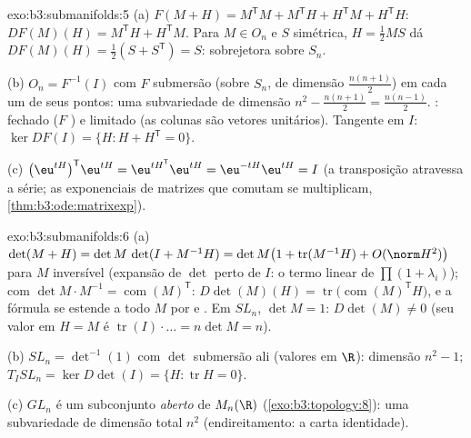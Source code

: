 \begin{solution}{exo:b3:submanifolds:5}
(a) $F(M + H) = M^{\mathsf T}M + M^{\mathsf T}H + H^{\mathsf
T}M + H^{\mathsf T}H$: $DF(M)(H) = M^{\mathsf T}H +
H^{\mathsf T}M$. Para $M \in O_n$ e $S$ simétrica, $H =
\frac12MS$ dá $DF(M)(H) = \frac12(S + S^{\mathsf T}) = S$:
sobrejetora sobre $S_n$.

(b) $O_n = F^{-1}(I)$ com $F$ submersão (sobre $S_n$, de
dimensão $\frac{n(n+1)}2$) em cada um de seus pontos:
uma subvariedade de dimensão $n^2 - \frac{n(n+1)}2 =
\frac{n(n-1)}2$. : fechado ($F$ ) e limitado
(as colunas são vetores unitários). Tangente em $I$: $\ker DF(I) =
\{H : H + H^{\mathsf T} = 0\}$.

(c) $\bigl(\eu^{tH}\bigr)^{\mathsf T}\eu^{tH} =
\eu^{tH^{\mathsf T}}\eu^{tH} = \eu^{-tH}\eu^{tH} = I$
(a transposição atravessa a série; as exponenciais de matrizes
que comutam se multiplicam,
\cref{thm:b3:ode:matrixexp}).
\end{solution}

\begin{solution}{exo:b3:submanifolds:6}
(a) $\det(M + H) = \det M\,\det(I + M^{-1}H) = \det M\bigl(1
+ \operatorname{tr}(M^{-1}H) + O(\norm H^2)\bigr)$ para
$M$ inversível (expansão de $\det$ perto de $I$: o termo linear
de $\prod(1 + \lambda_i)$); com $\det M\cdot M^{-1} =
\operatorname{com}(M)^{\mathsf T}$:
$D\det(M)(H) = \operatorname{tr}\bigl(\operatorname{com}
(M)^{\mathsf T}H\bigr)$, e a fórmula se estende a todo $M$
por  e . Em $SL_n$, $\det M = 1$:
$D\det(M) \ne 0$ (seu valor em $H = M$ é
$\operatorname{tr}(I)\cdot\dots = n\det M = n$).

(b) $SL_n = \det^{-1}(1)$ com $\det$ submersão ali
(valores em $\R$): dimensão $n^2 - 1$; $T_ISL_n = \ker
D\det(I) = \{H : \operatorname{tr}H = 0\}$.

(c) $GL_n$ é um subconjunto \emph{aberto} de $M_n(\R)$
(\cref{exo:b3:topology:8}): uma subvariedade de dimensão total
$n^2$ (endireitamento: a carta identidade).
\end{solution}

